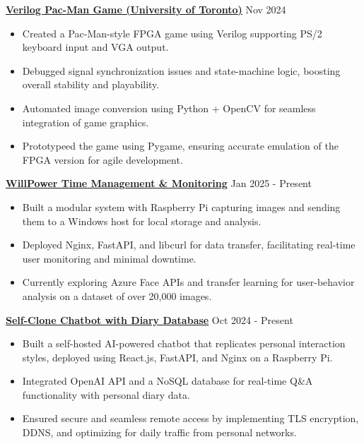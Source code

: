 \documentclass[a4paper,10pt]{article}
\begin{document}
\vspace{0.3cm}
\noindent\href{https://github.com/Ken-2511/ECE241-Project}{\uline{
\textbf{Verilog Pac-Man Game (University of Toronto)}}} \hfill Nov 2024
\begin{itemize}[leftmargin=0.2in]
    \item Created a Pac-Man-style FPGA game using Verilog supporting PS/2 keyboard input and VGA output.
    \item Debugged signal synchronization issues and state-machine logic, boosting overall stability and playability.
    \item Automated image conversion using Python + OpenCV for seamless integration of game graphics.
    \item Prototypeed the game using Pygame, ensuring accurate emulation of the FPGA version for agile development.
\end{itemize}

\vspace{0.3cm}
\noindent\href{https://github.com/Ken-2511/WillPower}{\uline{
\textbf{WillPower \textbar{} Time Management \& Monitoring}}} \hfill Jan 2025 - Present
\begin{itemize}[leftmargin=0.2in]
    \item Built a modular system with Raspberry Pi capturing images and sending them to a Windows host for local storage and analysis.
    \item Deployed Nginx, FastAPI, and libcurl for data transfer, facilitating real-time user monitoring and minimal downtime.
    \item Currently exploring Azure Face APIs and transfer learning for user-behavior analysis on a dataset of over 20,000 images.
\end{itemize}

\vspace{0.3cm}
\noindent\href{https://chengyongkang.me/chat}{\uline{
\textbf{Self-Clone Chatbot with Diary Database}}} \hfill Oct 2024 - Present
\begin{itemize}[leftmargin=0.2in]
    \item Built a self-hosted AI-powered chatbot that replicates personal interaction styles, deployed using React.js, FastAPI, and Nginx on a Raspberry Pi.
    \item Integrated OpenAI API and a NoSQL database for real-time Q\&A functionality with personal diary data.
    \item Ensured secure and seamless remote access by implementing TLS encryption, DDNS, and optimizing for daily traffic from personal networks.
\end{itemize}
\end{document}
